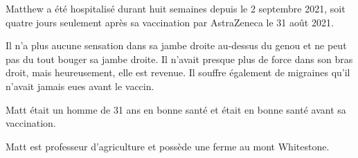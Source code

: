 Matthew a été hospitalisé durant huit semaines depuis le 2 septembre 2021, soit
quatre jours seulement après sa vaccination par AstraZeneca le 31 août 2021.

Il n'a plus aucune sensation dans sa jambe droite au-dessus du genou et ne peut
pas du tout bouger sa jambe droite. Il n'avait presque plus de force dans son
bras droit, mais heureusement, elle est revenue. Il souffre également de
migraines qu'il n'avait jamais eues avant le vaccin.

Matt était un homme de 31 ans en bonne santé et était en bonne santé avant sa
vaccination.

Matt est professeur d'agriculture et possède une ferme au mont Whitestone.

